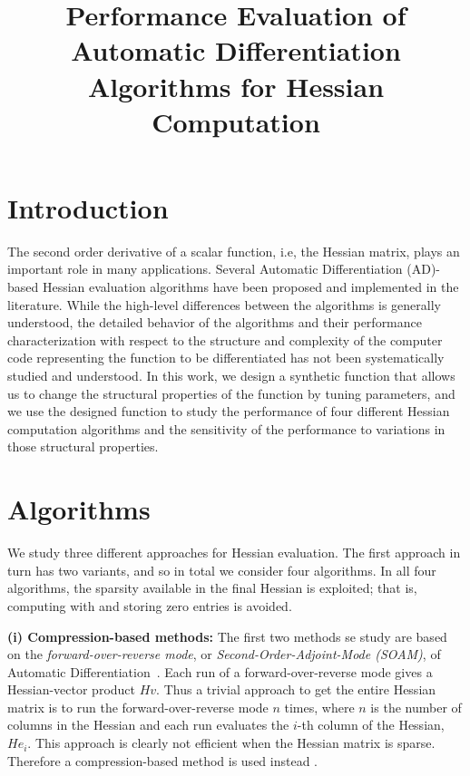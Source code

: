\documentclass[final,leqno,onefignum,onetabnum]{siamart}
\begin{document}
\title{Performance Evaluation of Automatic Differentiation Algorithms for Hessian Computation}
\maketitle

\section*{Introduction}
The second order derivative of a scalar function, i.e, the Hessian matrix, plays 
an important role in many applications. 
Several Automatic Differentiation (AD)-based Hessian evaluation algorithms have been proposed and implemented in the literature. While the high-level differences between the algorithms is generally understood, the detailed behavior of the algorithms and their performance characterization with respect to the structure and complexity of the computer code  representing the function to be differentiated has not been systematically studied and understood. In this work, we design a synthetic function that allows us to change the structural properties of the function by tuning parameters, and we use the designed function to study the performance of four different Hessian computation algorithms and the sensitivity of the performance to variations in those structural properties.

\section*{Algorithms}

We study three different approaches for Hessian evaluation. The first approach in turn has two variants, and so in total we consider four algorithms. In all four algorithms, 
the sparsity available in the final Hessian is exploited; that is, computing with and storing zero entries is avoided.  

{\bf (i) Compression-based methods:}
The first two methods se study are based on the {\em forward-over-reverse mode}, or {\em Second-Order-Adjoint-Mode (SOAM)}, of Automatic Differentiation~\cite{griewank2008evaluating, naumann2012art}. Each run of a forward-over-reverse mode gives a Hessian-vector product $Hv$. Thus a trivial approach to get the entire Hessian matrix is to run the forward-over-reverse mode $n$ times, where $n$ is the number of columns in the Hessian and each run evaluates the $i$-th column of the Hessian, $He_i$. This approach is clearly not efficient  when the Hessian matrix is sparse.  Therefore a compression-based method is used instead \cite{gebremedhin2009efficient}. 
\end{document}
